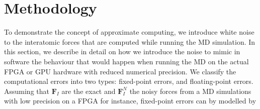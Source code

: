 \documentclass[format=acmsmall,review,timestamp,urlbreakonhyphens]{acmart}
\begin{document}
\section{Methodology}
\label{sec:methodology}
To demonstrate the concept of approximate computing, we introduce white noise to the interatomic forces that are computed while running the MD simulation. In this section, we describe in detail on how we introduce the noise to mimic in software the behaviour that would happen when running the MD on the actual FPGA or GPU hardware with reduced numerical precision. We classify the computational errors into two types: fixed-point errors, and floating-point errors. Assuming that $\textbf{F}_{I}$ are the exact and $\textbf{F}_{I}^{N}$ the noisy forces from a MD simulations with low precision on a FPGA for instance, fixed-point errors can by modelled by
\end{document}
